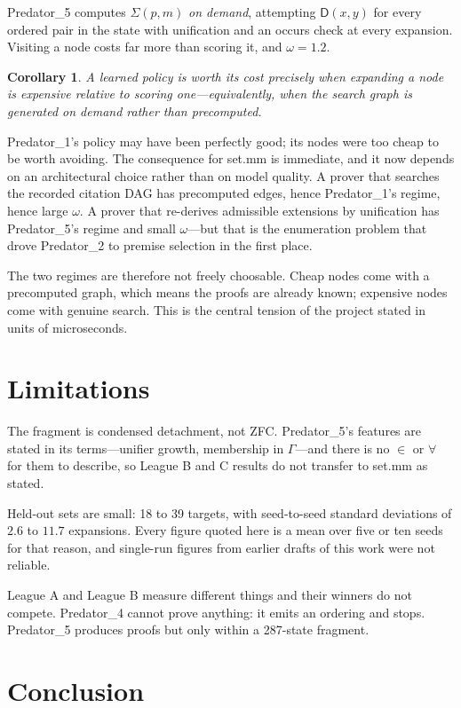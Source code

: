 \documentclass[11pt]{article}
\theoremstyle{plain}
\newtheorem{corollary}[theorem]{Corollary}
\theoremstyle{definition}
\theoremstyle{remark}
\newcommand{\Sig}{\Sigma}
\newcommand{\D}{\mathsf{D}}
\begin{document}
Predator\_5 computes $\Sig(p,m)$ \emph{on demand}, attempting $\D(x,y)$ for every
ordered pair in the state with unification and an occurs check at every
expansion. Visiting a node costs far more than scoring it, and $\omega = 1.2$.

\begin{corollary}
A learned policy is worth its cost precisely when expanding a node is expensive
relative to scoring one---equivalently, when the search graph is generated on
demand rather than precomputed.
\end{corollary}

Predator\_1's policy may have been perfectly good; its nodes were too cheap to be
worth avoiding. The consequence for set.mm is immediate, and it now depends on an
architectural choice rather than on model quality. A prover that searches the
recorded citation DAG has precomputed edges, hence Predator\_1's regime, hence
large $\omega$. A prover that re-derives admissible extensions by unification has
Predator\_5's regime and small $\omega$---but that is the enumeration problem
that drove Predator\_2 to premise selection in the first place.

The two regimes are therefore not freely choosable. Cheap nodes come with a
precomputed graph, which means the proofs are already known; expensive nodes come
with genuine search. This is the central tension of the project stated in units
of microseconds.

\section{Limitations}

The fragment is condensed detachment, not ZFC. Predator\_5's features are stated
in its terms---unifier growth, membership in $\Gamma$---and there is no
$\in$ or $\forall$ for them to describe, so League B and C results do not
transfer to set.mm as stated.

Held-out sets are small: 18 to 39 targets, with seed-to-seed standard deviations
of $2.6$ to $11.7$ expansions. Every figure quoted here is a mean over five or
ten seeds for that reason, and single-run figures from earlier drafts of this
work were not reliable.

League A and League B measure different things and their winners do not compete.
Predator\_4 cannot prove anything: it emits an ordering and stops. Predator\_5
produces proofs but only within a 287-state fragment.

\section{Conclusion}
\end{document}

